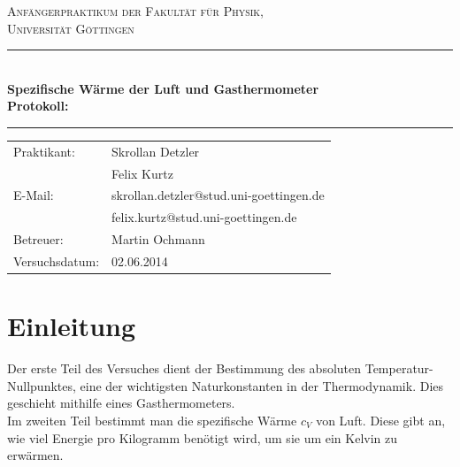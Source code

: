 \documentclass[12pt,a4paper,titlepage,headinclude,bibtotoc]{scrartcl}
\begin{document}
\begin{titlepage}
\centering
\textsc{\Large Anfängerpraktikum der Fakultät für
  Physik,\\[1.5ex] Universität Göttingen}

\vspace*{4.2cm}

\rule{\textwidth}{1pt}\\[0.5cm]
{\huge \bfseries
  Spezifische Wärme der Luft und Gasthermometer\\[1.5ex]
  Protokoll:}\\[0.5cm]
\rule{\textwidth}{1pt}

\vspace*{2.0cm}

\begin{Large}
\begin{tabular}{ll}
Praktikant:
	&  Skrollan Detzler\\
 	&  Felix Kurtz\\

  E-Mail: 
	&  skrollan.detzler@stud.uni-goettingen.de\\
	&  felix.kurtz@stud.uni-goettingen.de\\
	

 Betreuer: & Martin Ochmann\\
 Versuchsdatum: & 02.06.2014\\
\end{tabular}
\end{Large}

\vspace*{0.8cm}

\begin{Large}
\end{Large}

\end{titlepage}

\tableofcontents

\newpage

\section{Einleitung}
\label{sec:einleitung}
Der erste Teil des Versuches dient der Bestimmung des absoluten Temperatur-Nullpunktes, eine der wichtigsten Naturkonstanten in der Thermodynamik.
Dies geschieht mithilfe eines Gasthermometers.\\
Im zweiten Teil bestimmt man die spezifische Wärme $c_V$ von Luft.
Diese gibt an, wie viel Energie pro Kilogramm benötigt wird, um sie um ein Kelvin zu erwärmen.
\end{document}
